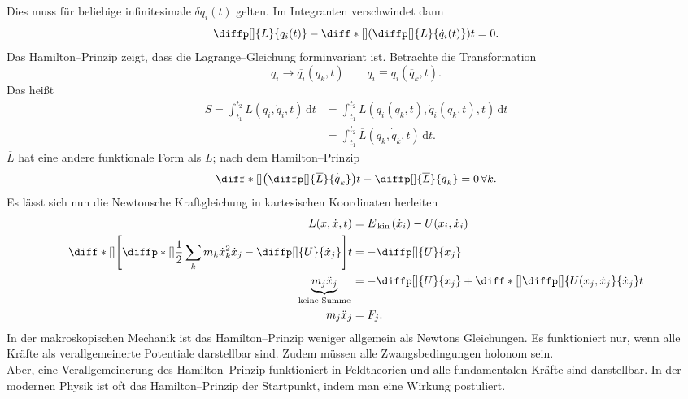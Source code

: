 \documentclass[a4paper,12pt]{article}
\newcommand{\td}{\,\text{d}}
\numberwithin{equation}{section}
\begin{document}
Dies muss für beliebige infinitesimale $\delta q_i(t)$ gelten. Im Integranten verschwindet dann 
\[ 
        \diffp[]{L}{q_i(t)}-\diff*[]{\left(\diffp[]{L}{\dot{q}_i(t)}\right)}{t}=0
.\] 
Das Hamilton--Prinzip zeigt, dass die Lagrange--Gleichung forminvariant ist. Betrachte die Transformation
\[ 
        q_i\rightarrow \overline{q_i}(q_k,t)\qquad q_i\equiv q_i(\overline{q}_k,t)
.\] 
Das heißt
\begin{align*}
        S=\int_{t_1}^{t_2}L(q_i,\dot{q}_i,t)\td t&=\int_{t_1}^{t_2}L\left(q_i\left(\overline{q}_k,t\right),\dot{q}_i\left(\overline{q}_k,t\right),t\right)\td t\\
                                                 &=\int_{t_1}^{t_2}\overline{L}\left(\overline{q}_k,\dot{\overline{q}}_k,t\right)\td t
.\end{align*}
$\overline{L}$ hat eine andere funktionale Form als $L$; nach dem Hamilton--Prinzip 
\[ 
        \diff*[]{\left(\diffp[]{\overline{L}}{\dot{\overline{q}}_k}\right)}{t}-\diffp[]{\overline{L}}{\overline{q}_k}=0\,\forall k
.\] 
Es lässt sich nun die Newtonsche Kraftgleichung in kartesischen Koordinaten herleiten
\begin{align*}
        L(x,\dot{x},t)&=E_{\,\text{kin}\,}(\dot{x}_i)-U(x_i,\dot{x}_i)\\
        \diff*[]{\left[\diffp*[]{\dfrac{1}{2}\sum_{k}^{}m_k\dot{x}_k^2}{\dot{x}_j}-\diffp[]{U}{\dot{x}_j}\right]}{t}&=-\diffp[]{U}{x_j}\\
        \underbrace{m_j\ddot{x}_j}_{\,\text{keine Summe}\,}&=-\diffp[]{U}{x_j}+\diff*[]{\diffp[]{U(x_j,\dot{x}_j}{\dot{x}_j}}{t}\\
        m_j\ddot{x}_j&=F_j
.\end{align*}
In der makroskopischen Mechanik ist das Hamilton--Prinzip weniger allgemein als Newtons Gleichungen. Es funktioniert nur, wenn alle Kräfte als verallgemeinerte Potentiale darstellbar sind. Zudem müssen alle Zwangsbedingungen holonom sein.\\\indent
Aber, eine Verallgemeinerung des Hamilton--Prinzip funktioniert in Feldtheorien und alle fundamentalen Kräfte sind darstellbar. In der modernen Physik ist oft das Hamilton--Prinzip der Startpunkt, indem man eine Wirkung postuliert.
\end{document}
